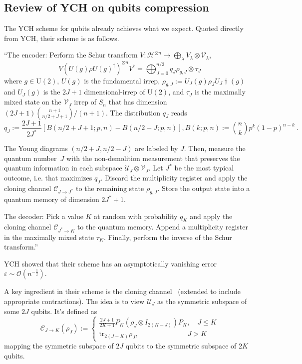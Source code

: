 \documentclass[11pt,letterpaper]{article}
\def\eps{\varepsilon}
\def\O{\mathcal{O}}
\def\h{\mathcal{H}}
\def\tr{\mathrm{tr}}
\def\C{\mathcal{C}}
\begin{document}
\subsection{Review of YCH on qubits compression}
The YCH scheme for qubits already achieves what we expect. Quoted directly from YCH, their scheme is as follows. 

``The encoder: Perform the Schur transform $V: \h^{\otimes n}\to\bigoplus_{\lambda} V_\lambda\otimes\mathcal{V}_\lambda$,
\begin{equation}\label{eq:schur}
    V(U(g)\rho U(g)^\dagger)^{\otimes n} V^\dagger = \bigoplus_{J=0}^{n/2} q_J \rho_{g,J}\otimes \tau_{J}
\end{equation}
where $g\in\mathrm{U}(2)$, $U(g)$ is the fundamental irrep, $\rho_{g,J}:=U_J(g) \rho_J U_J\dagger(g)$ and $U_J(g)$ is the $2J+1$ dimensional-irrep of $\mathrm{U}(2)$, and $\tau_J$ is the maximally mixed state on the $\mathcal{V}_J$ irrep of $S_n$ that has dimension $(2J+1)\binom{n+1}{n/2+J+1}/(n+1)$. The distribution $q_J$ reads
\begin{equation}
    q_J := \frac{2J+1}{2J^*}\left[B(n/2+J+1;p,n)-B(n/2-J;p,n)\right], B(k;p,n):=\binom{n}{k}p^{k}(1-p)^{n-k}\ .
\end{equation}

The Young diagrams $(n/2+J,n/2-J)$ are labeled by $J$. Then, measure the quantum number~$J$ with the non-demolition measurement that preserves the quantum information in each subspace $\mathcal{U}_J\otimes\mathcal{V}_J$. Let $J^*$ be the most typical outcome, i.e. that maximizes $q_J$. Discard the multiplicity register and apply the cloning channel $\C_{J\to J^*}$ to the remaining state $\rho_{g,J}$. Store the output state into a quantum memory of dimension $2J^* + 1$.

The decoder: Pick a value $K$ at random with probability $q_K$ and apply the cloning channel $\C_{J^*\to K}$ to the
quantum memory. Append a multiplicity register in the maximally mixed state $\tau_K$. Finally, perform the inverse of the Schur transform.''

YCH showed that their scheme has an asymptotically vanishing error $\eps\sim\O(n^{-\frac12})$.

A key ingredient in their scheme is the cloning channel~\cite{werner1998optimal,keyl1999optimal} (extended to include appropriate contractions). The idea is to view $\mathcal{U}_J$ as the symmetric subspace of some $2J$ qubits. It's defined as 
\begin{equation}\label{eq:qubitcloning}
\C_{J\to K}(\rho_J):=
    \begin{cases}
       \frac{2J+1}{2K+1} P_K(\rho_J\otimes I_{2(K-J)} )P_K,\quad J\le K\\
       \tr_{2(J-K)}\rho_J,\qquad\qquad\qquad\quad J>K
    \end{cases}
\end{equation}
mapping the symmetric subspace of $2J$ qubits to the symmetric subspace of $2K$ qubits.
\end{document}
